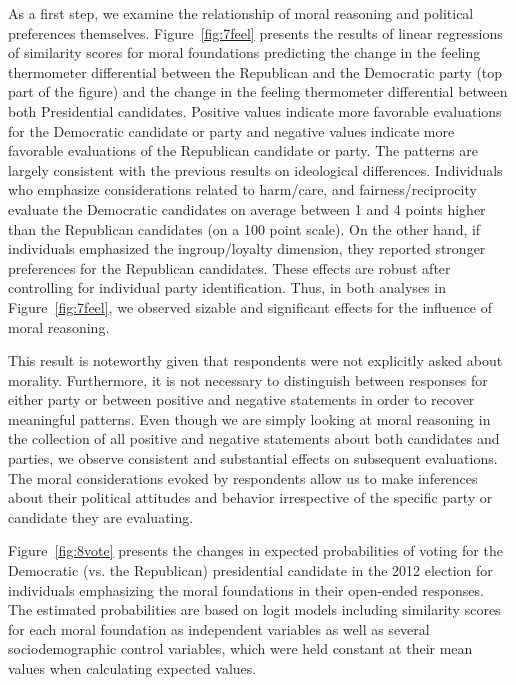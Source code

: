 \documentclass[12pt]{article}
\begin{document}
As a first step, we examine the relationship of moral reasoning and political preferences themselves. Figure~\ref{fig:7feel} presents the results of linear regressions of similarity scores for moral foundations predicting the change in the feeling thermometer differential between the Republican and the Democratic party (top part of the figure) and the change in the feeling thermometer differential between both Presidential candidates. Positive values indicate more favorable evaluations for the Democratic candidate or party and negative values indicate more favorable evaluations of the Republican candidate or party. The patterns are largely consistent with the previous results on ideological differences. Individuals who emphasize considerations related to harm/care, and fairness/reciprocity evaluate the Democratic candidates on average between 1 and 4 points higher than the Republican candidates (on a 100 point scale). On the other hand, if individuals emphasized the ingroup/loyalty dimension, they reported stronger preferences for the Republican candidates. These effects are robust after controlling for individual party identification. Thus, in both analyses in Figure~\ref{fig:7feel}, we observed sizable and significant effects for the influence of moral reasoning.

This result is noteworthy given that respondents were not explicitly asked about morality. Furthermore, it is not necessary to distinguish between responses for either party or between positive and negative statements in order to recover meaningful patterns. Even though we are simply looking at moral reasoning in the collection of all positive and negative statements about both candidates and parties, we observe consistent and substantial effects on subsequent evaluations. The moral considerations evoked by respondents allow us to make inferences about their political attitudes and behavior irrespective of the specific party or candidate they are evaluating.

Figure~\ref{fig:8vote} presents the changes in expected probabilities of voting for the Democratic (vs. the Republican) presidential candidate in the 2012 election for individuals emphasizing the moral foundations in their open-ended responses. The estimated probabilities are based on logit models including similarity scores for each moral foundation as independent variables as well as several sociodemographic control variables, which were held constant at their mean values when calculating expected values.
\end{document}
